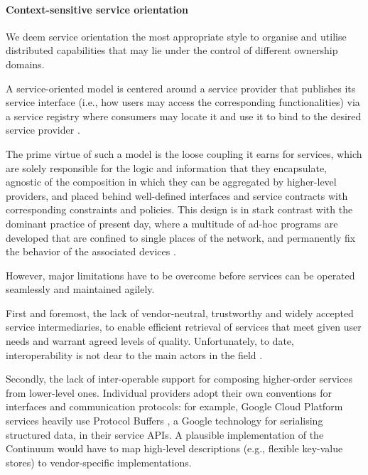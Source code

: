 \paragraph{Context-sensitive service orientation}
We deem service orientation the most appropriate style to organise and utilise distributed capabilities that may lie under the control of different ownership domains. 

A service-oriented model is centered around a service provider that publishes its service interface (i.e., how users may access the corresponding functionalities) via a service registry where consumers may locate it and use it to bind to the desired service provider \cite{haller2008internet}.

The prime virtue of such a model is the loose coupling it earns for services, which are solely responsible for the logic and information that they encapsulate, agnostic of the composition in which they can be aggregated by higher-level providers, and placed behind well-defined interfaces and service contracts with corresponding constraints and policies.
This design is in stark contrast with the dominant practice of present day, where a multitude of ad-hoc programs are developed that are confined to single places of the network, and permanently fix the behavior of the associated devices \cite{beckman2020harnessing}.

However, major limitations have to be overcome before services can be operated seamlessly and maintained agilely.  

First and foremost, the lack of vendor-neutral, trustworthy and widely accepted service intermediaries, to enable efficient retrieval of services that meet given user needs and warrant agreed levels of quality. Unfortunately, to date, interoperability is not dear to the main actors in the field \cite{grozev2014inter}.

Secondly, the lack of inter-operable support for composing higher-order services from lower-level ones. 
Individual providers adopt their own conventions for interfaces and communication protocols: for example, Google Cloud Platform services heavily use Protocol Buffers \cite{protobuf}, a Google technology for serialising structured data, in their service APIs. 
A plausible implementation of the Continuum would have to map high-level descriptions (e.g., flexible key-value stores) to vendor-specific implementations.


